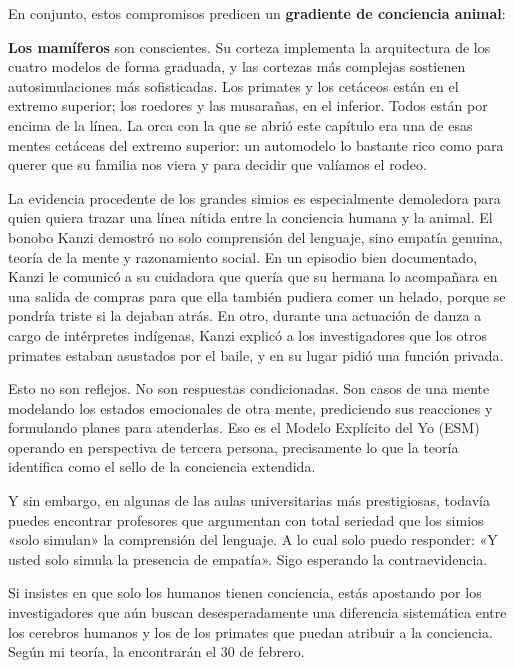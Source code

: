 \documentclass[11pt, twoside, openright]{book}
\begin{document}
En conjunto, estos compromisos predicen un \textbf{gradiente de conciencia animal}:

\textbf{Los mamíferos} son conscientes. Su corteza implementa la arquitectura de los cuatro modelos de forma graduada, y las cortezas más complejas sostienen autosimulaciones más sofisticadas. Los primates y los cetáceos están en el extremo superior; los roedores y las musarañas, en el inferior. Todos están por encima de la línea. La orca con la que se abrió este capítulo era una de esas mentes cetáceas del extremo superior: un automodelo lo bastante rico como para querer que su familia nos viera y para decidir que valíamos el rodeo.

La evidencia procedente de los grandes simios es especialmente demoledora para quien quiera trazar una línea nítida entre la conciencia humana y la animal. El bonobo Kanzi demostró no solo comprensión del lenguaje, sino empatía genuina, teoría de la mente y razonamiento social. En un episodio bien documentado, Kanzi le comunicó a su cuidadora que quería que su hermana lo acompañara en una salida de compras para que ella también pudiera comer un helado, porque se pondría triste si la dejaban atrás. En otro, durante una actuación de danza a cargo de intérpretes indígenas, Kanzi explicó a los investigadores que los otros primates estaban asustados por el baile, y en su lugar pidió una función privada.

Esto no son reflejos. No son respuestas condicionadas. Son casos de una mente modelando los estados emocionales de otra mente, prediciendo sus reacciones y formulando planes para atenderlas. Eso es el Modelo Explícito del Yo (ESM) operando en perspectiva de tercera persona, precisamente lo que la teoría identifica como el sello de la conciencia extendida.

Y sin embargo, en algunas de las aulas universitarias más prestigiosas, todavía puedes encontrar profesores que argumentan con total seriedad que los simios «solo simulan» la comprensión del lenguaje. A lo cual solo puedo responder: «Y usted solo simula la presencia de empatía». Sigo esperando la contraevidencia.

Si insistes en que solo los humanos tienen conciencia, estás apostando por los investigadores que aún buscan desesperadamente una diferencia sistemática entre los cerebros humanos y los de los primates que puedan atribuir a la conciencia. Según mi teoría, la encontrarán el 30 de febrero.
\end{document}
